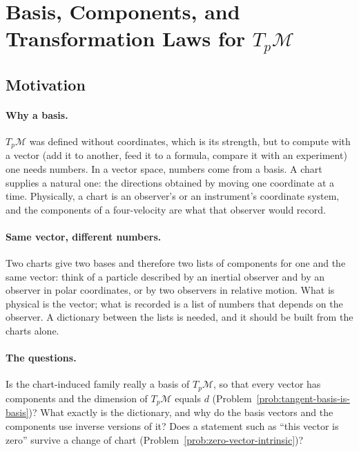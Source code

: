 \documentclass[11pt]{article}
\newcommand{\TpM}{T_p\mathcal M}
\begin{document}
\section{Basis, Components, and Transformation Laws for $T_p\mathcal M$}

\subsection*{Motivation}

\paragraph{Why a basis.}
$\TpM$ was defined without coordinates, which is its strength, but to compute with a vector (add it to another, feed it to a formula, compare it with an experiment) one needs numbers. In a vector space, numbers come from a basis. A chart supplies a natural one: the directions obtained by moving one coordinate at a time. Physically, a chart is an observer's or an instrument's coordinate system, and the components of a four-velocity are what that observer would record.

\paragraph{Same vector, different numbers.}
Two charts give two bases and therefore two lists of components for one and the same vector: think of a particle described by an inertial observer and by an observer in polar coordinates, or by two observers in relative motion. What is physical is the vector; what is recorded is a list of numbers that depends on the observer. A dictionary between the lists is needed, and it should be built from the charts alone.

\paragraph{The questions.}
Is the chart-induced family really a basis of $\TpM$, so that every vector has components and the dimension of $\TpM$ equals $d$ (Problem~\ref{prob:tangent-basis-is-basis})? What exactly is the dictionary, and why do the basis vectors and the components use inverse versions of it? Does a statement such as ``this vector is zero'' survive a change of chart (Problem~\ref{prob:zero-vector-intrinsic})?
\end{document}
